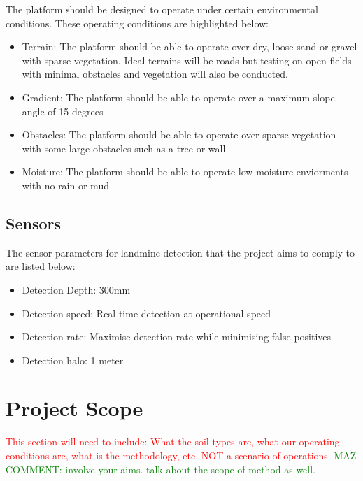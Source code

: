\documentclass[main.tex]{subfiles}
\begin{document}
The platform should be designed to operate under certain environmental conditions. These operating conditions are highlighted below:
\begin{itemize}
\item Terrain: The platform should be able to operate over dry, loose sand or gravel with sparse vegetation. Ideal terrains will be roads but testing on open fields with minimal obstacles and vegetation will also be conducted.
\item Gradient: The platform should be able to operate over a maximum slope angle of 15 degrees
\item Obstacles: The platform should be able to operate over sparse vegetation with some large obstacles such as a tree or wall
\item Moisture: The platform should be able to operate low moisture enviorments with no rain or mud
\end{itemize}
\subsection{Sensors}
The sensor parameters for landmine detection that the project aims to comply to are listed below:
\begin{itemize}
\item Detection Depth: 300mm 
\item Detection speed: Real time detection at operational speed
\item Detection rate: Maximise detection rate while minimising false positives
\item Detection halo: 1 meter %
\end{itemize}

\section{Project Scope}
\textcolor{red}{This section will need to include: What the soil types are, what our operating conditions are, what is the methodology, etc. NOT a scenario of operations.} 
\textcolor{green}{MAZ COMMENT: involve your aims. talk about the scope of method as well.}
\end{document}
